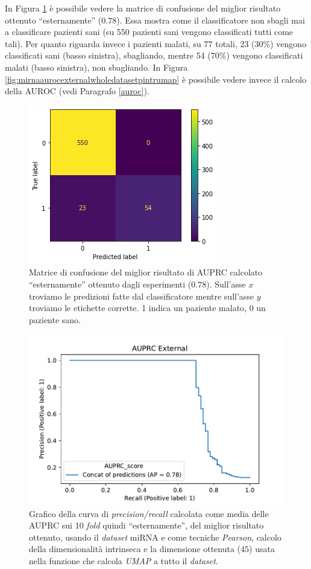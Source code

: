 \documentclass[12pt,italian]{report}
\begin{document}
	In Figura \ref{fig:confusionmatrixbestresult} è possibile vedere la matrice di confusione del miglior risultato ottenuto ``esternamente'' ($0.78$). Essa mostra come il classificatore non sbagli mai a classificare pazienti sani (su 550 pazienti sani vengono classificati tutti come tali). Per quanto riguarda invece i pazienti malati, su 77 totali, 23 ($30\%$) vengono classificati sani (basso sinistra), sbagliando, mentre 54 ($70\%$) vengono classificati malati (basso sinistra), non sbagliando. In Figura \ref{fig:mirnaaurocexternalwholedatasetpintrumap} è possibile vedere invece il calcolo della AUROC (vedi Paragrafo \ref{auroc}).

	
	
	\begin{figure}[h]
		\centering
		\includegraphics[width=0.7\linewidth]{immagini/ConfusionMatrixBestResult}
		\caption{Matrice di confusione del miglior risultato di AUPRC calcolato ``esternamente'' ottenuto dagli esperimenti ($0.78$). Sull'asse $x$ troviamo le predizioni fatte dal classificatore mentre sull'asse $y$ troviamo le etichette corrette. 1 indica un paziente malato, 0 un paziente sano.}
		\label{fig:confusionmatrixbestresult}
	\end{figure}
	

	\begin{figure}[h]
		\centering
		\includegraphics[width=0.7\linewidth]{immagini/mirna_AUPRC_External_whole_dataset_P_intr_umap}
		\caption{Grafico della curva di \textit{precision/recall} calcolata come media delle AUPRC sui 10 \textit{fold} quindi ``esternamente'', del miglior risultato ottenuto, usando il \textit{dataset} miRNA e come tecniche \textit{Pearson}, calcolo della dimensionalità intrinseca e la dimensione ottenuta ($45$) usata nella funzione che calcola \textit{UMAP} a tutto il \textit{dataset}.}
		\label{fig:mirnaauprcexternalwholedatasetpintrumap}
	\end{figure}
\end{document}
